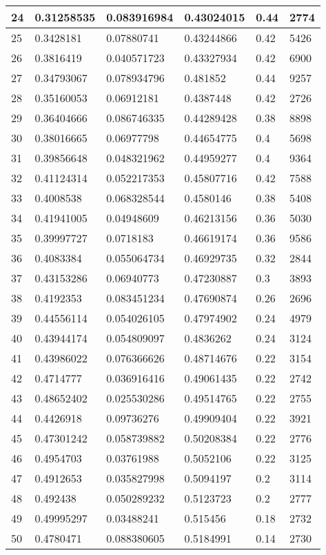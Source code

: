 \begin{longtable}{|l|l|l|l|l|l|}
24 & 0.31258535 & 0.083916984 & 0.43024015 & 0.44 & 2774 \\ \hline 
25 & 0.3428181 & 0.07880741 & 0.43244866 & 0.42 & 5426 \\ \hline 
26 & 0.3816419 & 0.040571723 & 0.43327934 & 0.42 & 6900 \\ \hline 
27 & 0.34793067 & 0.078934796 & 0.481852 & 0.44 & 9257 \\ \hline 
28 & 0.35160053 & 0.06912181 & 0.4387448 & 0.42 & 2726 \\ \hline 
29 & 0.36404666 & 0.086746335 & 0.44289428 & 0.38 & 8898 \\ \hline 
30 & 0.38016665 & 0.06977798 & 0.44654775 & 0.4 & 5698 \\ \hline 
31 & 0.39856648 & 0.048321962 & 0.44959277 & 0.4 & 9364 \\ \hline 
32 & 0.41124314 & 0.052217353 & 0.45807716 & 0.42 & 7588 \\ \hline 
33 & 0.4008538 & 0.068328544 & 0.4580146 & 0.38 & 5408 \\ \hline 
34 & 0.41941005 & 0.04948609 & 0.46213156 & 0.36 & 5030 \\ \hline 
35 & 0.39997727 & 0.0718183 & 0.46619174 & 0.36 & 9586 \\ \hline 
36 & 0.4083384 & 0.055064734 & 0.46929735 & 0.32 & 2844 \\ \hline 
37 & 0.43153286 & 0.06940773 & 0.47230887 & 0.3 & 3893 \\ \hline 
38 & 0.4192353 & 0.083451234 & 0.47690874 & 0.26 & 2696 \\ \hline 
39 & 0.44556114 & 0.054026105 & 0.47974902 & 0.24 & 4979 \\ \hline 
40 & 0.43944174 & 0.054809097 & 0.4836262 & 0.24 & 3124 \\ \hline 
41 & 0.43986022 & 0.076366626 & 0.48714676 & 0.22 & 3154 \\ \hline 
42 & 0.4714777 & 0.036916416 & 0.49061435 & 0.22 & 2742 \\ \hline 
43 & 0.48652402 & 0.025530286 & 0.49514765 & 0.22 & 2755 \\ \hline 
44 & 0.4426918 & 0.09736276 & 0.49909404 & 0.22 & 3921 \\ \hline 
45 & 0.47301242 & 0.058739882 & 0.50208384 & 0.22 & 2776 \\ \hline 
46 & 0.4954703 & 0.03761988 & 0.5052106 & 0.22 & 3125 \\ \hline 
47 & 0.4912653 & 0.035827998 & 0.5094197 & 0.2 & 3114 \\ \hline 
48 & 0.492438 & 0.050289232 & 0.5123723 & 0.2 & 2777 \\ \hline 
49 & 0.49995297 & 0.03488241 & 0.515456 & 0.18 & 2732 \\ \hline 
50 & 0.4780471 & 0.088380605 & 0.5184991 & 0.14 & 2730 \\ \hline 
\end{longtable}